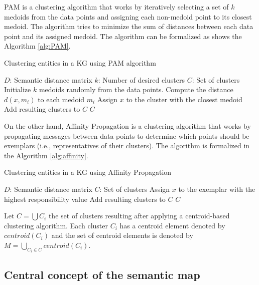 \documentclass{ieeeaccess}
\begin{document}
PAM is a clustering algorithm that works by iteratively selecting a set of $k$ medoids from the data points and assigning each non-medoid point to its closest medoid. The algorithm tries to minimize the sum of distances between each data point and its assigned medoid. The algorithm can be formalized as
shows the Algorithm \ref{alg:PAM}.

\begin{algorithm}
\caption{Clustering entities in a KG using PAM algorithm}
\label{alg:PAM}
\begin{algorithmic}[1]
\renewcommand{\algorithmicrequire}{\textbf{Input:}}
\renewcommand{\algorithmicensure}{\textbf{Output:}}
\REQUIRE $D$: Semantic distance matrix
\REQUIRE $k$: Number of desired clusters
\ENSURE $C$: Set of clusters
\STATE Initialize $k$ medoids randomly from the data points.
    \STATE Compute the distance $d(x, m_i)$ to each medoid $m_i$
    \STATE Assign $x$ to the cluster with the closest medoid
\ENDFOR
\STATE Add resulting clusters to $C$
\RETURN $C$
\end{algorithmic} 
\end{algorithm}

\newpage
On the other hand, Affinity Propagation is a clustering algorithm that works by propagating messages between data points to determine which points should be exemplars (i.e., representatives of their clusters). The algorithm is formalized in the Algorithm \ref{alg:affinity}.

\begin{algorithm}
\caption{Clustering entities in a KG using Affinity Propagation}
\label{alg:affinity}
\begin{algorithmic}[1]
\renewcommand{\algorithmicrequire}{\textbf{Input:}}
\renewcommand{\algorithmicensure}{\textbf{Output:}}
\REQUIRE $D$: Semantic distance matrix
\ENSURE $C$: Set of clusters
    \STATE Assign $x$ to the exemplar with the highest responsibility value
\ENDFOR
\STATE Add resulting clusters to $C$
\RETURN $C$
\end{algorithmic} 
\end{algorithm}

Let $C = \bigcup C_{i}$ the set of clusters 
resulting after applying a centroid-based clustering
algorithm. Each cluster $C_{i}$ has a centroid element
denoted by $centroid(C_{i})$ and the set of centroid
elements is denoted by $M = \bigcup_{C_{i} 
\in C} centroid(C_{i})$.

\subsection{Central concept of the semantic map}
\end{document}
